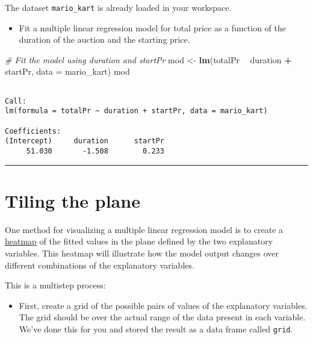 \documentclass[]{book}
\newenvironment{Shaded}{\begin{snugshade}}{\end{snugshade}}
\newcommand{\KeywordTok}[1]{\textcolor[rgb]{0.13,0.29,0.53}{\textbf{#1}}}
\newcommand{\DataTypeTok}[1]{\textcolor[rgb]{0.13,0.29,0.53}{#1}}
\newcommand{\StringTok}[1]{\textcolor[rgb]{0.31,0.60,0.02}{#1}}
\newcommand{\CommentTok}[1]{\textcolor[rgb]{0.56,0.35,0.01}{\textit{#1}}}
\newcommand{\OperatorTok}[1]{\textcolor[rgb]{0.81,0.36,0.00}{\textbf{#1}}}
\newcommand{\NormalTok}[1]{#1}
\providecommand{\tightlist}{%
  \setlength{\itemsep}{0pt}\setlength{\parskip}{0pt}}
\begin{document}
The dataset \texttt{mario\_kart} is already loaded in your workspace.

\begin{itemize}
\tightlist
\item
  Fit a multiple linear regression model for total price as a function
  of the duration of the auction and the starting price.
\end{itemize}

\begin{Shaded}
\begin{Highlighting}[]
\CommentTok{# Fit the model using duration and startPr}
\NormalTok{mod <-}\StringTok{ }\KeywordTok{lm}\NormalTok{(totalPr }\OperatorTok{~}\StringTok{ }\NormalTok{duration }\OperatorTok{+}\StringTok{ }\NormalTok{startPr, }\DataTypeTok{data =}\NormalTok{ mario_kart)}
\NormalTok{mod}
\end{Highlighting}
\end{Shaded}

\begin{verbatim}

Call:
lm(formula = totalPr ~ duration + startPr, data = mario_kart)

Coefficients:
(Intercept)     duration      startPr  
     51.030       -1.508        0.233  
\end{verbatim}

\begin{center}\rule{0.5\linewidth}{\linethickness}\end{center}

\section{Tiling the plane}\label{tiling-the-plane}

One method for visualizing a multiple linear regression model is to
create a \href{https://en.wikipedia.org/wiki/Heat_map}{heatmap} of the
fitted values in the plane defined by the two explanatory variables.
This heatmap will illustrate how the model output changes over different
combinations of the explanatory variables.

This is a multistep process:

\begin{itemize}
\tightlist
\item
  First, create a grid of the possible pairs of values of the
  explanatory variables. The grid should be over the actual range of the
  data present in each variable. We've done this for you and stored the
  result as a data frame called \texttt{grid}.
\end{itemize}
\end{document}
